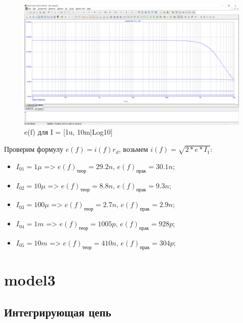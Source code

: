 \documentclass[a4paper, 12pt]{article}%
\begin{document}
\subsection{}

\begin{figure}[h!]
    \centering
    \includegraphics[scale = 0.4 \textwidth]{images/mod2_3.png}
    \caption{e(f) для I = [1u, 10m|Log10]}
    \label{fig:m23}
\end{figure}

Проверим формулу $e(f) = i(f)r_d$, возьмем $i(f) = \sqrt{2*e*I_1}$:
\begin{itemize}
    \item $I_{01} = 1\mu$ => $e(f)_\text{теор} = 29.2n$, $e(f)_\text{прак} = 30.1n$;
    \item $I_{02} = 10\mu$ => $e(f)_\text{теор} = 8.8n$, $e(f)_\text{прак} = 9.3n$;
    \item $I_{03} = 100\mu$ => $e(f)_\text{теор} = 2.7n$, $e(f)_\text{прак} = 2.9n$;
    \item $I_{04} = 1m$ => $e(f)_\text{теор} = 1005p$, $e(f)_\text{прак} = 928p$;
    \item $I_{05} = 10m$ => $e(f)_\text{теор} = 410n$, $e(f)_\text{прак} = 304p$;
\end{itemize}

\section{\textbf{model3}}

\subsection{Интегрирующая цепь}
\end{document}
